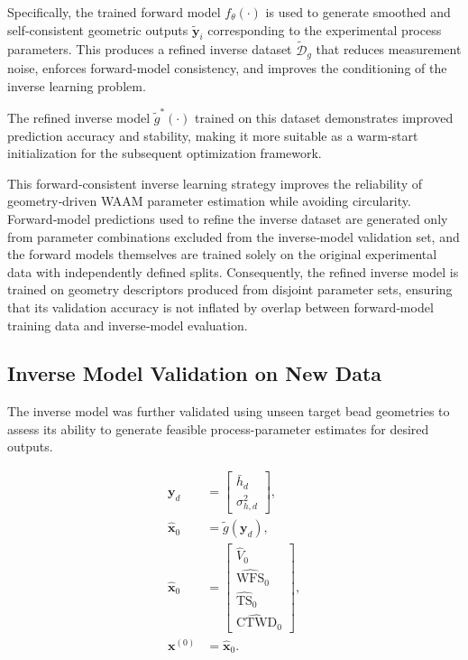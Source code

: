 \documentclass[11pt]{article}
\begin{document}
Specifically, the trained forward model $f_{\theta}(\cdot)$ is used to generate smoothed and self-consistent geometric outputs $\tilde{\mathbf{y}}_i$ corresponding to the experimental process parameters. This produces a refined inverse dataset $\tilde{\mathcal{D}}_{g}$ that reduces measurement noise, enforces forward-model consistency, and improves the conditioning of the inverse learning problem.

The refined inverse model $\tilde{g}^{*}(\cdot)$ trained on this dataset demonstrates improved prediction accuracy and stability, making it more suitable as a warm-start initialization for the subsequent optimization framework.

This forward‑consistent inverse learning strategy improves the reliability of geometry‑driven WAAM parameter estimation while avoiding circularity. Forward‑model predictions used to refine the inverse dataset are generated only from parameter combinations excluded from the inverse‑model validation set, and the forward models themselves are trained solely on the original experimental data with independently defined splits. Consequently, the refined inverse model is trained on geometry descriptors produced from disjoint parameter sets, ensuring that its validation accuracy is not inflated by overlap between forward‑model training data and inverse‑model evaluation.

\subsection{Inverse Model Validation on New Data}

The inverse model was further validated using unseen target bead geometries to assess its ability to generate feasible process-parameter estimates for desired outputs.

\begin{tcolorbox}[colback=white,colframe=black,boxrule=0.5pt,arc=2pt]
\begin{equation}
\begin{aligned}
\mathbf{y}_{d} &=
\begin{bmatrix}
\bar{h}_{d} \\
\sigma_{h,d}^{2}
\end{bmatrix}, \\
\hat{\mathbf{x}}_{0} &= \tilde{g}(\mathbf{y}_{d}), \\
\hat{\mathbf{x}}_{0} &=
\begin{bmatrix}
\hat{V}_{0} \\
\widehat{\mathrm{WFS}}_{0} \\
\widehat{\mathrm{TS}}_{0} \\
\widehat{\mathrm{CTWD}}_{0}
\end{bmatrix}, \\
\mathbf{x}^{(0)} &= \hat{\mathbf{x}}_{0}.
\end{aligned}
\end{equation}
\end{tcolorbox}
\end{document}
